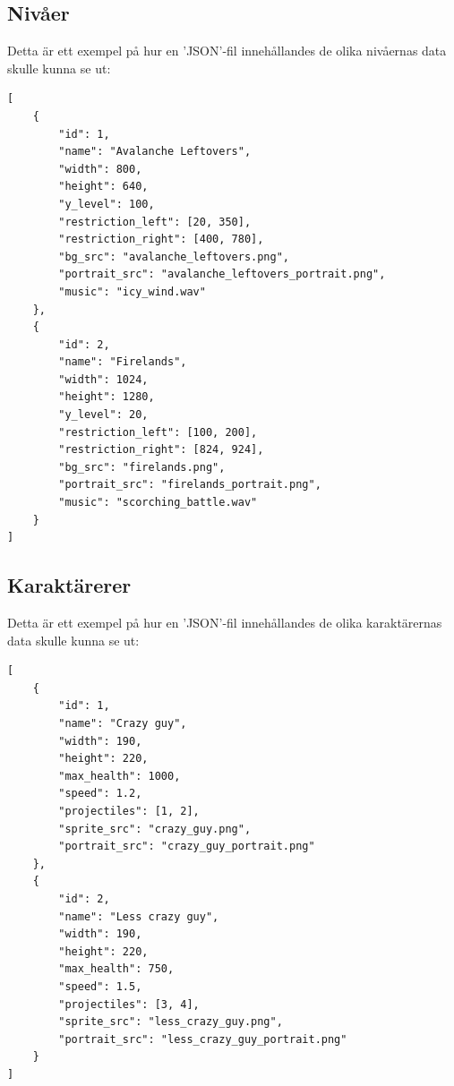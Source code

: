 \documentclass{TDP003mall}
\begin{document}
\newpage

\subsection{Nivåer}
Detta är ett exempel på hur en 'JSON'-fil innehållandes de olika nivåernas data skulle kunna se ut:
\begin{lstlisting}[backgroundcolor = \color{lightgray}]
[
    {
        "id": 1,
        "name": "Avalanche Leftovers",
        "width": 800,
        "height": 640,
        "y_level": 100,
        "restriction_left": [20, 350],
        "restriction_right": [400, 780],
        "bg_src": "avalanche_leftovers.png",
        "portrait_src": "avalanche_leftovers_portrait.png",
        "music": "icy_wind.wav"
    },
    {
        "id": 2,
        "name": "Firelands",
        "width": 1024,
        "height": 1280,
        "y_level": 20,
        "restriction_left": [100, 200],
        "restriction_right": [824, 924],
        "bg_src": "firelands.png",
        "portrait_src": "firelands_portrait.png",
        "music": "scorching_battle.wav"
    }
]
\end{lstlisting}

\newpage

\subsection{Karaktärerer}
Detta är ett exempel på hur en 'JSON'-fil innehållandes de olika karaktärernas data skulle kunna se ut:
\begin{lstlisting}[backgroundcolor = \color{lightgray}]
[
	{
		"id": 1,
		"name": "Crazy guy",
		"width": 190,
		"height": 220,
		"max_health": 1000,
		"speed": 1.2,
		"projectiles": [1, 2],      
		"sprite_src": "crazy_guy.png",
		"portrait_src": "crazy_guy_portrait.png"
	},
	{
		"id": 2,
		"name": "Less crazy guy",
		"width": 190,
		"height": 220,
		"max_health": 750,
		"speed": 1.5,
		"projectiles": [3, 4],
		"sprite_src": "less_crazy_guy.png",
		"portrait_src": "less_crazy_guy_portrait.png"
	}
]
\end{lstlisting}

\newpage
\end{document}
